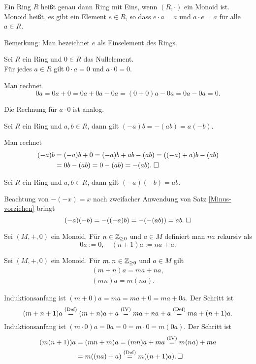 \begin{Definition}
Ein Ring $R$ heißt genau dann Ring mit Eins, wenn $(R,\cdot)$ ein
Monoid ist. Monoid heißt, es gibt ein Element $e\in R$, so dass
$e\cdot a = a$ und $a\cdot e = a$ für alle $a\in R$.
\end{Definition}
Bemerkung: Man bezeichnet $e$ als Einselement des Rings.

\begin{Satz}
Sei $R$ ein Ring und $0\in R$ das Nullelement.\\
Für jedes $a\in R$ gilt $0\cdot a = 0$ und $a\cdot 0 = 0$.
\end{Satz}
\begin{Beweis} Man rechnet
\[0a = 0a+0 = 0a+0a-0a = (0+0)a-0a = 0a-0a = 0.\]
\end{Beweis}
Die Rechnung für $a\cdot 0$ ist analog.\;\qedsymbol

\begin{Satz}\label{Minus-vorziehen}
Sei $R$ ein Ring und $a,b\in R$, dann gilt $(-a)b = -(ab) = a(-b)$.
\end{Satz}
\begin{Beweis}
Man rechnet
\begin{align*}
(-a)b &= (-a)b+0 = (-a)b+ab-(ab) = ((-a)+a)b-(ab)\\
&= 0b-(ab) = 0-(ab) = -(ab).\;\square
\end{align*}
\end{Beweis}

\begin{Satz}\newlinefirst
Sei $R$ ein Ring und $a,b\in R$, dann gilt
$(-a)(-b) = ab$.
\end{Satz}
Beachtung von $-(-x)=x$ nach zweifacher Anwendung von
Satz \ref{Minus-vorziehen} bringt
\[(-a)(-b) = -((-a)b) = -(-(ab)) = ab.\;\square\]

\begin{Definition}
Sei $(M,+,0)$ ein Monoid. Für $n\in\mathbb Z_{\ge 0}$ und $a\in M$ definiert
man $na$ rekursiv als
\[0a := 0,\quad (n+1)a := na + a.\]
\end{Definition}

\begin{Satz}
Sei $(M,+,0)$ ein Monoid. Für $m,n\in\mathbb Z_{\ge 0}$ und $a\in M$ gilt
\begin{gather}
(m+n)a = ma + na,\\
(mn)a = m(na).
\end{gather}
\end{Satz}
\begin{Beweis}
Induktionsanfang ist $(m+0)a = ma = ma+0 = ma + 0a$. Der Schritt ist%
\[(m+n+1)a \stackrel{\mathrm{(Def)}}{=} (m+n)a + a
\stackrel{\mathrm{(IV)}}{=} ma+na + a
\stackrel{\mathrm{(Def)}}{=} ma + (n+1)a.\]
Induktionsanfang ist $(m\cdot 0)a = 0a = 0 = m\cdot 0 = m(0a)$.
Der Schritt ist
\begin{align*}
(m(n+1))a &= (mn+m)a = (mn)a+ma \stackrel{\mathrm{(IV)}}{=} m(na)+ma\\
&= m((na)+a) \stackrel{\mathrm{(Def)}}{=}
m((n+1)a).\,\square
\end{align*}
\end{Beweis}

